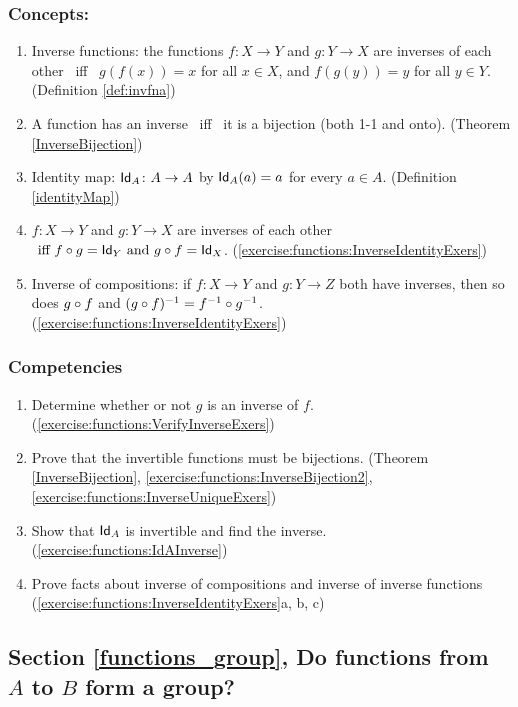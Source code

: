 \subsubsection*{Concepts:}
\begin{enumerate}
\item 
Inverse functions: the functions $f \colon X \to Y$  and $g \colon Y \to X$ are inverses of each other \mbox{ iff } $g(f(x)) = x$ for all $x \in X$, and $f(g(y)) = y$ for all $y \in Y$. (Definition \ref{def:invfna})
\item
A function has an inverse \mbox{ iff } it is a bijection (both 1-1 and onto). (Theorem \ref{InverseBijection})
\item
Identity map: ${\sf Id}_{A} \colon A \to A$ by ${\sf Id}_{A}(a) = a$ for every $a \in A$. (Definition \ref{identityMap})
\item
$f \colon X \to Y$ and $g \colon Y \to X$ are inverses of each other  $\mbox{ iff } f \circ g = {\sf Id}_{Y} \text{  and  }g \circ f = {\sf Id}_{X}$. (\ref{exercise:functions:InverseIdentityExers})
\item
Inverse of compositions: if $f \colon X \to Y$ and $g \colon Y \to Z$ both have inverses, then so does $g \circ f$  and 
$(g \circ f)^{-1} = f^{-1} \circ g^{-1}$. (\ref{exercise:functions:InverseIdentityExers})
\end{enumerate}

\subsubsection*{Competencies}
\begin{enumerate}
\item
Determine whether or not $g$ is an inverse of $f$. (\ref{exercise:functions:VerifyInverseExers})
\item
Prove that the invertible functions must be bijections. (Theorem \ref{InverseBijection}, \ref{exercise:functions:InverseBijection2}, \ref{exercise:functions:InverseUniqueExers})
\item
Show that ${\sf Id}_{A}$ is invertible and find the inverse. (\ref{exercise:functions:IdAInverse})
\item
Prove facts about inverse of compositions and inverse of inverse functions (\ref{exercise:functions:InverseIdentityExers}a, b, c)
\end{enumerate}


\subsection*{Section \ref{functions_group}, Do functions from $A$ to $B$ form a group?}
